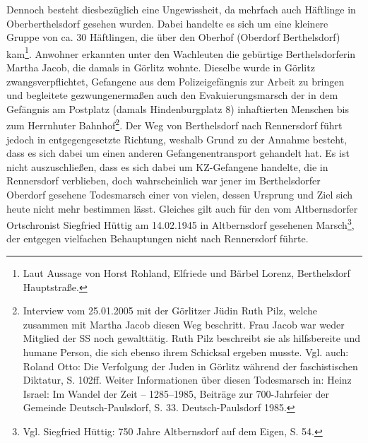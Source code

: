 Dennoch besteht diesbezüglich eine Ungewissheit, da mehrfach auch Häftlinge in Oberberthelsdorf gesehen wurden. Dabei handelte es sich um eine kleinere Gruppe von ca. 30 Häftlingen, die über den Oberhof (Oberdorf Berthelsdorf) kam\footnote{Laut Aussage von Horst Rohland, Elfriede und Bärbel Lorenz, Berthelsdorf Hauptstraße.}. Anwohner erkannten unter den Wachleuten die gebürtige Berthelsdorferin Martha Jacob, die damals in Görlitz wohnte. Dieselbe wurde in Görlitz zwangsverpflichtet, Gefangene aus dem Polizeigefängnis zur Arbeit zu bringen und begleitete gezwungenermaßen auch den Evakuierungsmarsch der in dem Gefängnis am Postplatz (damals Hindenburgplatz 8) inhaftierten Menschen bis zum Herrnhuter Bahnhof\footnote{Interview vom 25.01.2005 mit der Görlitzer Jüdin Ruth Pilz, welche zusammen mit Martha Jacob diesen Weg beschritt. Frau Jacob war weder Mitglied der SS noch gewalttätig. Ruth Pilz beschreibt sie als hilfsbereite und humane Person, die sich ebenso ihrem Schicksal ergeben musste. Vgl. auch: Roland Otto: Die Verfolgung der Juden in Görlitz während der faschistischen Diktatur, S. 102ff. Weiter Informationen über diesen Todesmarsch in: Heinz Israel: Im Wandel der Zeit -- 1285--1985, Beiträge zur 700-Jahrfeier der Gemeinde Deutsch-Paulsdorf, S. 33. Deutsch-Paulsdorf 1985. }. Der Weg von Berthelsdorf nach Rennersdorf führt jedoch in entgegengesetzte Richtung, weshalb Grund zu der Annahme besteht, dass es sich dabei um einen anderen Gefangenentransport gehandelt hat. Es ist nicht auszuschließen, dass es sich dabei um KZ-Gefangene handelte, die in Rennersdorf verblieben, doch wahrscheinlich war jener im Berthelsdorfer Oberdorf gesehene Todesmarsch einer von vielen, dessen Ursprung und Ziel sich heute nicht mehr bestimmen lässt. Gleiches gilt auch für den vom Altbernsdorfer Ortschronist Siegfried Hüttig am 14.02.1945 in Altbernsdorf gesehenen Marsch\footnote{Vgl. Siegfried Hüttig: 750 Jahre Altbernsdorf auf dem Eigen, S. 54.}, der entgegen vielfachen Behauptungen nicht nach Rennersdorf führte.



